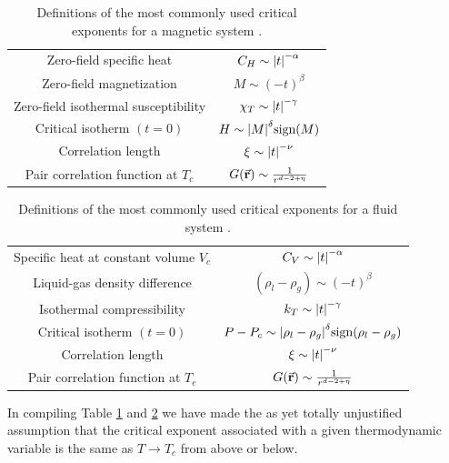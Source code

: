 \documentclass[../../Main/Main.tex]{subfiles}
\begin{document}
\begin{table}[h!]
  \begin{center}
\begin{tabular}{cc}
\toprule
 Zero-field specific heat & \( C_H \sim \abs{t}^{-\alpha }  \) \\
 Zero-field magnetization & \( M \sim (-t)^{\beta } \) \\
 Zero-field isothermal susceptibility & \( \chi _T \sim \abs{t}^{-\gamma  }  \) \\
 Critical isotherm \( (t=0) \) & \( H \sim \abs{M}^\delta \text{sign} (M)  \)  \\
 Correlation length & \( \xi \sim \abs{t}^{- \nu }  \) \\
 Pair correlation function at \( T_c \) & \( G (\va{r}) \sim \frac{1}{r^{d-2+ \eta }} \) \\
\bottomrule
\end{tabular}
\end{center}
\caption{\label{tab:3_1} Definitions of the most commonly used critical exponents for a magnetic system \cite{3_lesson_3}.}
\end{table}

\begin{table}[h!]
  \begin{center}
\begin{tabular}{cc}
\toprule
Specific heat at constant volume \( V_c \)  & \( C_V \sim \abs{t}^{-\alpha }  \) \\
Liquid-gas density difference & \( (\rho _l - \rho _g)\sim (-t)^{\beta } \) \\
Isothermal compressibility & \( k _T \sim \abs{t}^{-\gamma  }  \) \\
 Critical isotherm \( (t=0) \) & \( P-P_c \sim \abs{\rho _l - \rho _g}^\delta \text{sign} (\rho _l - \rho _g)  \)  \\
 Correlation length & \( \xi \sim \abs{t}^{- \nu }  \) \\
 Pair correlation function at \( T_c \) & \( G (\va{r}) \sim \frac{1}{r^{d-2+ \eta }} \) \\
\bottomrule
\end{tabular}
\end{center}
\caption{ \label{tab:3_2} Definitions of the most commonly used critical exponents for a fluid system \cite{3_lesson_3}.}
\end{table}

\begin{remark}
In compiling Table \ref{tab:3_1} and \ref{tab:3_2} we have made the as yet totally unjustified assumption that the critical exponent associated with a given thermodynamic variable is the same as \( T \rightarrow T_c \) from above or below.
\end{remark}
\end{document}
